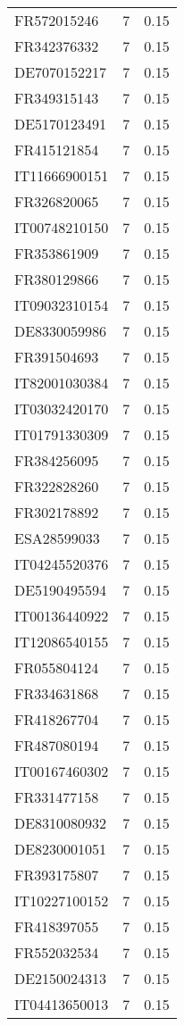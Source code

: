 \begin{table*}[htbp]
\begin{tabular}{lrr}
FR572015246 & 7 & 0.15 \\
FR342376332 & 7 & 0.15 \\
DE7070152217 & 7 & 0.15 \\
FR349315143 & 7 & 0.15 \\
DE5170123491 & 7 & 0.15 \\
FR415121854 & 7 & 0.15 \\
IT11666900151 & 7 & 0.15 \\
FR326820065 & 7 & 0.15 \\
IT00748210150 & 7 & 0.15 \\
FR353861909 & 7 & 0.15 \\
FR380129866 & 7 & 0.15 \\
IT09032310154 & 7 & 0.15 \\
DE8330059986 & 7 & 0.15 \\
FR391504693 & 7 & 0.15 \\
IT82001030384 & 7 & 0.15 \\
IT03032420170 & 7 & 0.15 \\
IT01791330309 & 7 & 0.15 \\
FR384256095 & 7 & 0.15 \\
FR322828260 & 7 & 0.15 \\
FR302178892 & 7 & 0.15 \\
ESA28599033 & 7 & 0.15 \\
IT04245520376 & 7 & 0.15 \\
DE5190495594 & 7 & 0.15 \\
IT00136440922 & 7 & 0.15 \\
IT12086540155 & 7 & 0.15 \\
FR055804124 & 7 & 0.15 \\
FR334631868 & 7 & 0.15 \\
FR418267704 & 7 & 0.15 \\
FR487080194 & 7 & 0.15 \\
IT00167460302 & 7 & 0.15 \\
FR331477158 & 7 & 0.15 \\
DE8310080932 & 7 & 0.15 \\
DE8230001051 & 7 & 0.15 \\
FR393175807 & 7 & 0.15 \\
IT10227100152 & 7 & 0.15 \\
FR418397055 & 7 & 0.15 \\
FR552032534 & 7 & 0.15 \\
DE2150024313 & 7 & 0.15 \\
IT04413650013 & 7 & 0.15 \\

\end{tabular}
\end{table*}
